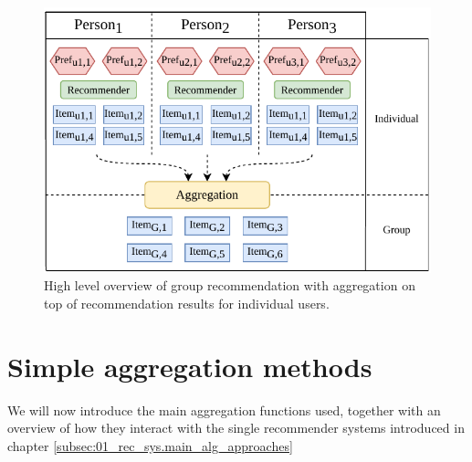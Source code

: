 \begin{figure}[htbp]
    \centering
    \includegraphics{img/after-rec-aggregation.pdf}
    \caption{High level overview of group recommendation with aggregation on top of recommendation results for individual users.}
    \label{fig:after_rec_agg}
\end{figure}



\section{Simple aggregation methods}\label{sec:03_simple_aggregation_metods}
We will now introduce the main aggregation functions used, together with an overview of how they interact with the single recommender systems introduced in chapter \ref{subsec:01_rec_sys.main_alg_approaches}
